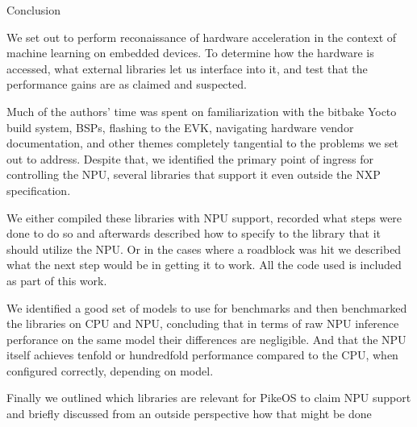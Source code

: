 
\chap Conclusion

We set out to perform reconaissance of
hardware acceleration
in the context of machine learning on embedded devices.
To determine how the hardware is accessed,
what external libraries let us interface into it,
and test that the performance gains are as claimed and suspected.

Much of the authors' time was spent
on familiarization with the bitbake Yocto build system,
BSPs,
flashing to the EVK,
navigating hardware vendor documentation,
and other themes completely tangential
to the problems we set out to address.
Despite that, we identified the primary
point of ingress for controlling the NPU,
several libraries that support it
even outside the NXP specification.

We either compiled these libraries with NPU support,
recorded what steps were done to do so
and afterwards described how to specify to the library
that it should utilize the NPU.
Or in the cases where a roadblock was hit
we described what the next step would
be in getting it to work.
All the code used is included
as part of this work.

We identified a good set of models to use for benchmarks
and then benchmarked the libraries on CPU and NPU,
concluding that in terms of raw NPU
inference perforance on the same model
their differences are negligible.
And that the NPU itself achieves
tenfold or hundredfold performance compared to the CPU,
when configured correctly,
depending on model.

Finally we outlined which libraries are relevant
for PikeOS to claim NPU support
and briefly discussed from an outside perspective
how that might be done

